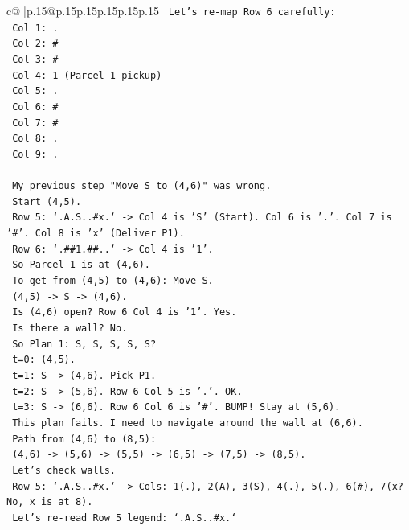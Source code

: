 \documentclass{article}
\begin{document}
{\begin{supertabular}{c@{$\;$}|p{.15\linewidth}@{}p{.15\linewidth}p{.15\linewidth}p{.15\linewidth}p{.15\linewidth}p{.15\linewidth}}
{{{\texttt{   Let's re{-}map Row 6 carefully:} \\
\texttt{   Col 1: .} \\
\texttt{   Col 2: \#} \\
\texttt{   Col 3: \#} \\
\texttt{   Col 4: 1 (Parcel 1 pickup)} \\
\texttt{   Col 5: .} \\
\texttt{   Col 6: \#} \\
\texttt{   Col 7: \#} \\
\texttt{   Col 8: .} \\
\texttt{   Col 9: .} \\
\\ 
\texttt{   My previous step "Move S to (4,6)" was wrong.} \\
\texttt{   Start (4,5).} \\
\texttt{   Row 5: `.A.S..\#x.` {-}> Col 4 is 'S' (Start). Col 6 is '.'. Col 7 is '\#'. Col 8 is 'x' (Deliver P1).} \\
\texttt{   Row 6: `.\#\#1.\#\#..` {-}> Col 4 is '1'.} \\
\texttt{   So Parcel 1 is at (4,6).} \\
\texttt{   To get from (4,5) to (4,6): Move S.} \\
\texttt{   (4,5) {-}> S {-}> (4,6).} \\
\texttt{   Is (4,6) open? Row 6 Col 4 is '1'. Yes.} \\
\texttt{   Is there a wall? No.} \\
\texttt{   So Plan 1: S, S, S, S, S?} \\
\texttt{   t=0: (4,5).} \\
\texttt{   t=1: S {-}> (4,6). Pick P1.} \\
\texttt{   t=2: S {-}> (5,6). Row 6 Col 5 is '.'. OK.} \\
\texttt{   t=3: S {-}> (6,6). Row 6 Col 6 is '\#'. BUMP! Stay at (5,6).} \\
\texttt{   This plan fails. I need to navigate around the wall at (6,6).} \\
\texttt{   Path from (4,6) to (8,5):} \\
\texttt{   (4,6) {-}> (5,6) {-}> (5,5) {-}> (6,5) {-}> (7,5) {-}> (8,5).} \\
\texttt{   Let's check walls.} \\
\texttt{   Row 5: `.A.S..\#x.` {-}> Cols: 1(.), 2(A), 3(S), 4(.), 5(.), 6(\#), 7(x? No, x is at 8).} \\
\texttt{   Let's re{-}read Row 5 legend: `.A.S..\#x.`} \\
}}}
\end{supertabular}}
\end{document}
